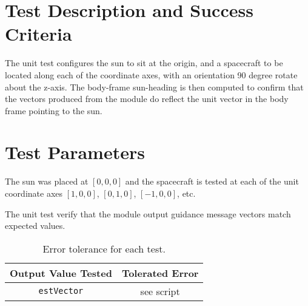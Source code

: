 
\section{Test Description and Success Criteria}
The unit test configures the sun to sit at the origin, and a spacecraft to be located along each of the coordinate axes, with an orientation 90 degree rotate about the z-axis. The body-frame sun-heading is then computed to confirm that the vectors produced from the module do reflect the unit vector in the body frame pointing to the sun. 


\section{Test Parameters}

The sun was placed at $[0, 0, 0]$ and the spacecraft is tested at each of the unit coordinate axes $[1, 0, 0]$, $[0, 1, 0]$, $[-1, 0, 0]$, etc. 

The unit test verify that the module output guidance message vectors match expected values.
\begin{table}[htbp]
	\caption{Error tolerance for each test.}
	\label{tab:errortol}
	\centering \fontsize{10}{10}\selectfont
	\begin{tabular}{ c | c } %
		\hline\hline
		\textbf{Output Value Tested}  & \textbf{Tolerated Error}  \\ 
		\hline
		{\tt estVector}        & see script	   \\ 
		\hline\hline
	\end{tabular}
\end{table}




%
%




